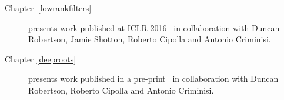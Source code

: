 \begin{acknowledgements}
\begin{description}
	\item[Chapter~\ref{lowrankfilters}] presents work published at ICLR 2016~\cite{Ioannou2016} in collaboration with Duncan Robertson, Jamie Shotton, Roberto Cipolla and Antonio Criminisi.

	\item[Chapter \ref{deeproots}] presents work published in a pre-print~\cite{ioannou2016deep} in collaboration with  Duncan Robertson, Roberto Cipolla and Antonio Criminisi.
\end{description}


\end{acknowledgements}
